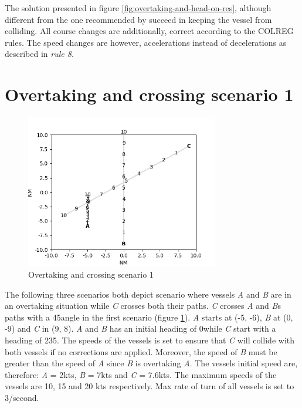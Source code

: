 The solution presented in figure \ref{fig:overtaking-and-head-on-res}, although different from the one recommended by \textcite{ecolreg_overtaking-and-head-on}succeed in keeping the vessel from colliding. All course changes are additionally, correct according to the COLREG rules. The speed changes are however, accelerations instead of decelerations as described in  \textit{rule 8}.


\section{Overtaking and crossing scenario 1}%


\label{sec:overtaking-and-crossing}
\begin{figure}[H]
    \centering
    \includegraphics[width=0.75\textwidth,height=0.75\textheight,keepaspectratio]{../src/img/overtaking_crossing.png}
    \caption{Overtaking and crossing scenario 1 \cite{ecolreg_overtaking-and-crossing}}
    \label{fig:overtaking-and-crossing}
\end{figure}
The following three scenarios both depict scenario where vessels \textit{A} and \textit{B} are in an overtaking situation while \textit{C} crosses both their paths. \textit{C} crosses \textit{A} and \textit{B}s paths with a 45\textdegree  angle in the first scenario (figure \ref{fig:overtaking-and-crossing}). \textit{A} starts at (-5, -6), \textit{B} at (0, -9) and \textit{C} in (9, 8). \textit{A} and \textit{B} has an initial heading of 0\textdegree  while \textit{C} start with a heading of 235\textdegree. The speeds of the vessels is set to ensure that \textit{C} will collide with both vessels if no corrections are applied. Moreover, the speed of \textit{B} must be greater than the speed of \textit{A} since \textit{B} is overtaking \textit{A}. The vessels initial speed are, therefore: \textit{A} = 2kts, \textit{B} = 7kts and \textit{C} = 7.6kts. The maximum speeds of the vessels are 10, 15 and 20 kts respectively. Max rate of turn of all vessels is set to 3\textdegree/second.

